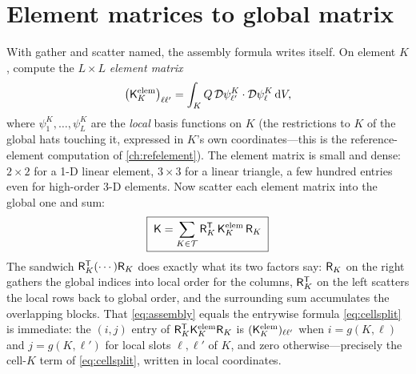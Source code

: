 \section{Element matrices to global matrix}
\label{sec:elem-to-global}

With gather and scatter named, the assembly formula writes itself. On element
$K$, compute the $L\times L$ \emph{element matrix}
\begin{equation}
\bigl(\mathsf{K}^{\mathrm{elem}}_K\bigr)_{\ell\ell'}
=\int_K Q\,\mathcal{D}\psi^K_{\ell'}\cdot\mathcal{D}\psi^K_{\ell}\,\mathrm{d}V,
\label{eq:elemmat}
\end{equation}
where $\psi^K_1,\dots,\psi^K_L$ are the \emph{local} basis functions on $K$ (the
restrictions to $K$ of the global hats touching it, expressed in $K$'s own
coordinates---this is the reference-element computation of
\cref{ch:refelement}). The element matrix is small and dense: $2\times2$ for a
1-D linear element, $3\times3$ for a linear triangle, a few hundred entries even
for high-order 3-D elements. Now scatter each element matrix into the global one
and sum:
\begin{equation}
\boxed{\;\mathsf{K}=\sum_{K\in\mathcal{T}}\mathsf{R}_K^{\mathsf T}\,
\mathsf{K}^{\mathrm{elem}}_K\,\mathsf{R}_K\;}
\label{eq:assembly}
\end{equation}
The sandwich $\mathsf{R}_K^{\mathsf T}(\cdots)\mathsf{R}_K$ does exactly what its two
factors say: $\mathsf{R}_K$ on the right gathers the global indices into local order
for the columns, $\mathsf{R}_K^{\mathsf T}$ on the left scatters the local rows back
to global order, and the surrounding sum accumulates the overlapping blocks. That
\cref{eq:assembly} equals the entrywise formula \cref{eq:cellsplit} is immediate:
the $(i,j)$ entry of $\mathsf{R}_K^{\mathsf T}\mathsf{K}^{\mathrm{elem}}_K\mathsf{R}_K$ is
$(\mathsf{K}^{\mathrm{elem}}_K)_{\ell\ell'}$ when $i=g(K,\ell)$ and $j=g(K,\ell')$
for local slots $\ell,\ell'$ of $K$, and zero otherwise---precisely the cell-$K$
term of \cref{eq:cellsplit}, written in local coordinates.

